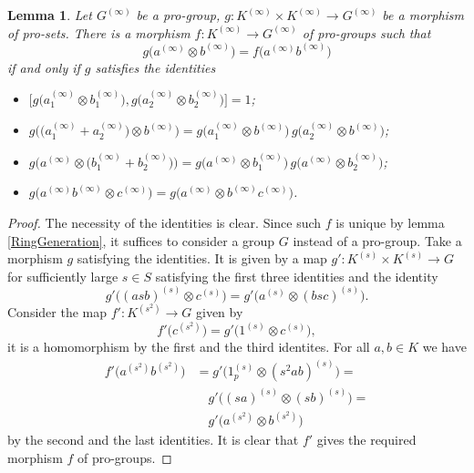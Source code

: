 \documentclass{article}
\newtheorem{lemma}{Lemma}
\newcommand{\rar}{\rightarrow}
\begin{document}
\begin{lemma}\label{RingPresentation}
Let \(G^{(\infty)}\) be a pro-group, \(g \colon K^{(\infty)} \times K^{(\infty)} \rar G^{(\infty)}\) be a morphism of pro-sets. There is a morphism \(f \colon K^{(\infty)} \rar G^{(\infty)}\) of pro-groups such that
\[g\bigl(a^{(\infty)} \otimes b^{(\infty)}\bigr) = f\bigl(a^{(\infty)} b^{(\infty)}\bigr)\]
if and only if \(g\) satisfies the identities
\begin{itemize}
\item \(\bigl[g\bigl(a_1^{(\infty)} \otimes b_1^{(\infty)}\bigr), g\bigl(a_2^{(\infty)} \otimes b_2^{(\infty)}\bigr)\bigr] = 1\);
\item \(g\bigl(\bigl(a_1^{(\infty)} + a_2^{(\infty)}\bigr) \otimes b^{(\infty)}\bigr) = g\bigl(a_1^{(\infty)} \otimes b^{(\infty)}\bigr)\, g\bigl(a_2^{(\infty)} \otimes b^{(\infty)}\bigr)\);
\item \(g\bigl(a^{(\infty)} \otimes \bigl(b_1^{(\infty)} + b_2^{(\infty)}\bigr)\bigr) = g\bigl(a^{(\infty)} \otimes b_1^{(\infty)}\bigr)\, g\bigl(a^{(\infty)} \otimes b_2^{(\infty)}\bigr)\);
\item \(g\bigl(a^{(\infty)} b^{(\infty)} \otimes c^{(\infty)}\bigr) = g\bigl(a^{(\infty)} \otimes b^{(\infty)} c^{(\infty)}\bigr)\).
\end{itemize}
\end{lemma}
\begin{proof}
The necessity of the identities is clear. Since such \(f\) is unique by lemma \ref{RingGeneration}, it suffices to consider a group \(G\) instead of a pro-group. Take a morphism \(g\) satisfying the identities. It is given by a map \(g' \colon K^{(s)} \times K^{(s)} \rar G\) for sufficiently large \(s \in S\) satisfying the first three identities and the identity 
\[g'\bigl((asb)^{(s)} \otimes c^{(s)}\bigr) = g'\bigl(a^{(s)} \otimes (bsc)^{(s)}\bigr).\]
Consider the map \(f' \colon K^{(s^2)} \rar G\) given by
\[f'\bigl(c^{(s^2)}\bigr) = g'\bigl(1^{(s)} \otimes c^{(s)}\bigr),\]
it is a homomorphism by the first and the third identites. For all \(a, b \in K\) we have
\begin{align*}
f'\bigl(a^{(s^2)} b^{(s^2)})
&= g' \bigl( 1^{(s)}_p \otimes (s^2 ab)^{(s)} \bigr) =\\
&\quad g' \bigl( (sa)^{(s)} \otimes (sb)^{(s)} \bigr) =\\
&\quad g' \bigl(a^{(s^2)} \otimes b^{(s^2)}\bigr)
\end{align*}
by the second and the last identities. It is clear that \(f'\) gives the required morphism \(f\) of pro-groups.
\end{proof}
\end{document}
